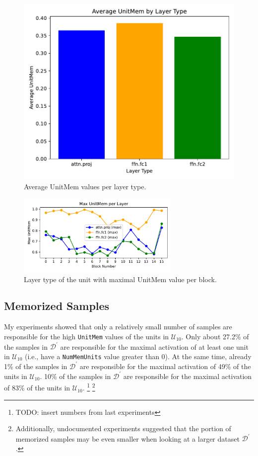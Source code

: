\documentclass{article} %
\begin{document}
\begin{figure}[ht]
\begin{minipage}{0.48\textwidth}
      \includegraphics[width=\textwidth]{figures/mem_avg_per_layer_type.pdf}
      \caption{Average UnitMem values per layer type.}
      \label{fig:mem_avg_per_layer_type}
   \end{minipage}
\end{figure}

\begin{figure}[ht]
   \centering
   \includegraphics[width=0.7\textwidth]{figures/mem_max_per_layer_num.pdf}
   \caption{Layer type of the unit with maximal UnitMem value per block.}
   \label{fig:mem_max_per_layer_num}
\end{figure}

\subsection{Memorized Samples}
My experiments showed that only a relatively small number of samples are responsible for the high \texttt{UnitMem} values of the units in $\mathcal{U}_{10}$.
Only about 27.2\% of the samples in $\mathcal{D}^\prime$ are responsible for the maximal activation of at least one unit in $\mathcal{U}_{10}$ (i.e., have a \texttt{NumMemUnits} value greater than 0).
At the same time, already 1\% of the samples in $\mathcal{D}^\prime$ are responsible for the maximal activation of 49\% of the units in $\mathcal{U}_{10}$.
10\% of the samples in $\mathcal{D}^\prime$ are responsible for the maximal activation of 83\% of the units in $\mathcal{U}_{10}$.
\footnote{TODO: insert numbers from last experiments}
\footnote{Additionally, undocumented experiments suggested that the portion of memorized samples may be even smaller when looking at a larger dataset $\mathcal{D}^\prime$.}
\end{document}
